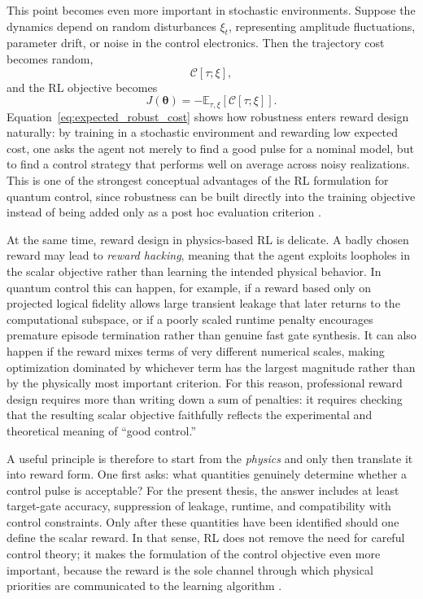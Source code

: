 This point becomes even more important in stochastic environments. Suppose the dynamics depend on random disturbances $\xi_t$, representing amplitude fluctuations, parameter drift, or noise in the control electronics. Then the trajectory cost becomes random,
\begin{equation}
\mathcal{C}[\tau;\xi],
\label{eq:stochastic_trajectory_cost}
\end{equation}
and the RL objective becomes
\begin{equation}
J(\bm{\theta})
=
-\mathbb{E}_{\tau,\xi}
\left[
\mathcal{C}[\tau;\xi]
\right].
\label{eq:expected_robust_cost}
\end{equation}
Equation~\eqref{eq:expected_robust_cost} shows how robustness enters reward design naturally: by training in a stochastic environment and rewarding low expected cost, one asks the agent not merely to find a good pulse for a nominal model, but to find a control strategy that performs well on average across noisy realizations. This is one of the strongest conceptual advantages of the RL formulation for quantum control, since robustness can be built directly into the training objective instead of being added only as a post hoc evaluation criterion \cite{Niu2019}.

At the same time, reward design in physics-based RL is delicate. A badly chosen reward may lead to \emph{reward hacking}, meaning that the agent exploits loopholes in the scalar objective rather than learning the intended physical behavior. In quantum control this can happen, for example, if a reward based only on projected logical fidelity allows large transient leakage that later returns to the computational subspace, or if a poorly scaled runtime penalty encourages premature episode termination rather than genuine fast gate synthesis. It can also happen if the reward mixes terms of very different numerical scales, making optimization dominated by whichever term has the largest magnitude rather than by the physically most important criterion. For this reason, professional reward design requires more than writing down a sum of penalties: it requires checking that the resulting scalar objective faithfully reflects the experimental and theoretical meaning of ``good control.''

A useful principle is therefore to start from the \emph{physics} and only then translate it into reward form. One first asks: what quantities genuinely determine whether a control pulse is acceptable? For the present thesis, the answer includes at least target-gate accuracy, suppression of leakage, runtime, and compatibility with control constraints. Only after these quantities have been identified should one define the scalar reward. In that sense, RL does not remove the need for careful control theory; it makes the formulation of the control objective even more important, because the reward is the sole channel through which physical priorities are communicated to the learning algorithm \cite{Giannelli2022,SuttonBarto2018}.

